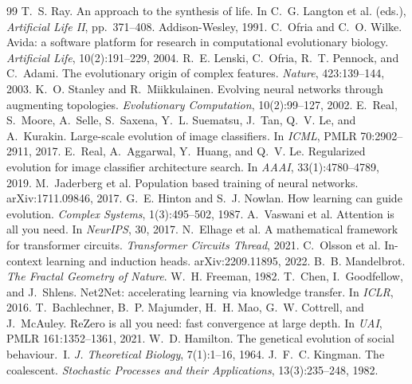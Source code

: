 \documentclass[10pt,twocolumn]{article}
\begin{document}
\begingroup
\footnotesize
\setlength{\itemsep}{0pt}
\begin{thebibliography}{99}
\setlength{\itemsep}{0pt}
\setlength{\parskip}{0pt}
 T.~S. Ray. An approach to the synthesis of life. In C.~G. Langton et al. (eds.), \emph{Artificial Life II}, pp.~371--408. Addison-Wesley, 1991.
 C.~Ofria and C.~O. Wilke. Avida: a software platform for research in computational evolutionary biology. \emph{Artificial Life}, 10(2):191--229, 2004.
 R.~E. Lenski, C.~Ofria, R.~T. Pennock, and C.~Adami. The evolutionary origin of complex features. \emph{Nature}, 423:139--144, 2003.
 K.~O. Stanley and R.~Miikkulainen. Evolving neural networks through augmenting topologies. \emph{Evolutionary Computation}, 10(2):99--127, 2002.
 E.~Real, S.~Moore, A.~Selle, S.~Saxena, Y.~L. Suematsu, J.~Tan, Q.~V. Le, and A.~Kurakin. Large-scale evolution of image classifiers. In \emph{ICML}, PMLR 70:2902--2911, 2017.
 E.~Real, A.~Aggarwal, Y.~Huang, and Q.~V. Le. Regularized evolution for image classifier architecture search. In \emph{AAAI}, 33(1):4780--4789, 2019.
 M.~Jaderberg et al. Population based training of neural networks. arXiv:1711.09846, 2017.
 G.~E. Hinton and S.~J. Nowlan. How learning can guide evolution. \emph{Complex Systems}, 1(3):495--502, 1987.
 A.~Vaswani et al. Attention is all you need. In \emph{NeurIPS}, 30, 2017.
 N.~Elhage et al. A mathematical framework for transformer circuits. \emph{Transformer Circuits Thread}, 2021.
 C.~Olsson et al. In-context learning and induction heads. arXiv:2209.11895, 2022.
 B.~B. Mandelbrot. \emph{The Fractal Geometry of Nature}. W.~H. Freeman, 1982.
 T.~Chen, I.~Goodfellow, and J.~Shlens. Net2Net: accelerating learning via knowledge transfer. In \emph{ICLR}, 2016.
 T.~Bachlechner, B.~P. Majumder, H.~H. Mao, G.~W. Cottrell, and J.~McAuley. ReZero is all you need: fast convergence at large depth. In \emph{UAI}, PMLR 161:1352--1361, 2021.
 W.~D. Hamilton. The genetical evolution of social behaviour.~I. \emph{J. Theoretical Biology}, 7(1):1--16, 1964.
 J.~F.~C. Kingman. The coalescent. \emph{Stochastic Processes and their Applications}, 13(3):235--248, 1982.
\end{thebibliography}
\endgroup
\end{document}
